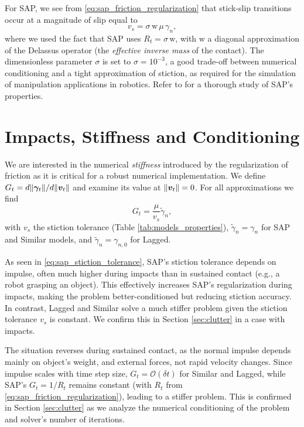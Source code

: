 For SAP, we see from \eqref{eq:sap_friction_regularization} that stick-slip
transitions occur at a magnitude of slip equal to
\begin{equation}
    v_s = \sigma\,\text{w}\,\mu\,\gamma_n,
    \label{eq:sap_stiction_tolerance}
\end{equation}
where we used the fact that SAP uses $R_t = \sigma\,\text{w}$, with $\text{w}$ a
diagonal approximation of the Delassus operator
\cite{bib:castro2022unconstrained} (the \emph{effective inverse mass} of the
contact). The dimensionless parameter $\sigma$ is set to $\sigma=10^{-3}$, a
good trade-off between numerical conditioning and a tight approximation of
stiction, as required for the simulation of manipulation applications in
robotics. Refer to \cite{bib:castro2022unconstrained} for a thorough study of
SAP's properties.

\section{Impacts, Stiffness and Conditioning}
\label{sec:impacts_and_conditioning}

We are interested in the numerical \emph{stiffness} introduced by the
regularization of friction as it is critical for a robust numerical
implementation. We define $G_t= d\Vert{\bm\gamma}_t\Vert/d\Vert{\bm{v}}_t\Vert$ and
examine its value at $\Vert{\bm{v}}_t\Vert=0$. For all approximations we find
\begin{equation*}
    G_t = \frac{\mu}{v_s}\tilde{\gamma}_n,
\end{equation*}
with $v_s$ the stiction tolerance (Table \ref{tab:models_properties}),
$\tilde{\gamma}_n =\gamma_n$ for SAP and Similar models, and $\tilde{\gamma}_n
=\gamma_{n,0}$ for Lagged.

As seen in \eqref{eq:sap_stiction_tolerance}, SAP's stiction tolerance depends
on impulse, often much higher during impacts than in sustained contact
(e.g., a robot grasping an object). This effectively increases SAP's
regularization during impacts, making the problem better-conditioned but
reducing stiction accuracy. In contrast, Lagged and Similar solve a much stiffer
problem given the stiction tolerance $v_s$ is constant. We confirm this in
Section \ref{sec:clutter} in a case with impacts.

The situation reverses during sustained contact, as the normal impulse depends
mainly on object's weight, and external forces, not rapid velocity changes.
Since impulse scales with time step size, $G_t = \mathcal{O}(\delta t)$ for
Similar and Lagged, while SAP's $G_t = 1/R_t$ remains constant (with $R_t$ from
\eqref{eq:sap_friction_regularization}), leading to a stiffer problem. This is
confirmed in Section \ref{sec:clutter} as we analyze the numerical conditioning
of the problem and solver's number of iterations.

